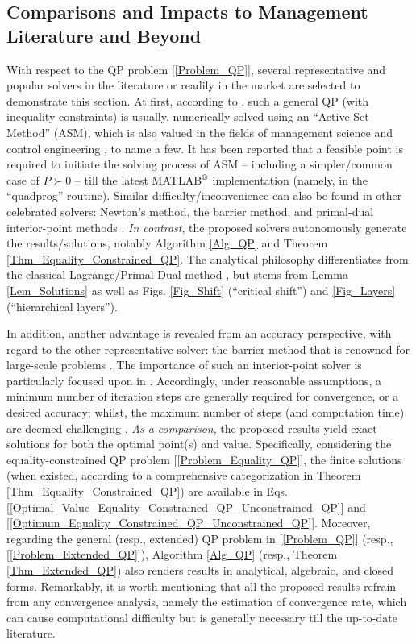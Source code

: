 \documentclass[9pt,twocolumn,twoside,lineno]{pnas-new-1}
\theoremstyle{remark}
\begin{document}
\subsection{Comparisons and Impacts to Management Literature and Beyond}
\label{Subsec_Literature_Comparison}
With respect to the QP problem [\ref{Problem_QP}], several representative and popular solvers in the literature or readily in the market \citep{NoWr:06} are selected to demonstrate this section. At first, according to \cite{Lu(Ye):03(16)}, such a general QP (with inequality constraints) is usually, numerically solved using an ``Active Set Method'' (ASM), which is also valued in the fields of management science \citep{Hey:acc,KoYa:91} and control engineering \citep{JoFo:13}, to name a few. It has been reported that a feasible point is required to initiate the solving process of ASM -- including a simpler/common case of $P\succ 0$ \citep{Lu(Ye):03(16)} -- till the latest MATLAB$\textsuperscript{\textregistered}$ implementation (namely, in the ``quadprog'' routine). Similar difficulty/inconvenience can also be found in other celebrated solvers: Newton's method, the barrier method, and primal-dual interior-point methods \citep{BoVa:04,Hey:acc,JoFo:13}. \textit{In contrast}, the proposed solvers autonomously generate the results/solutions, notably Algorithm \ref{Alg_QP} and Theorem \ref{Thm_Equality_Constrained_QP}. The analytical philosophy differentiates from the classical Lagrange/Primal-Dual method \citep{BoVa:04,Lu(Ye):03(16),NoWr:06}, but stems from Lemma \ref{Lem_Solutions} as well as Figs. \ref{Fig_Shift} (``critical shift'') and \ref{Fig_Layers} (``hierarchical layers'').

In addition, another advantage is revealed from an accuracy perspective, with regard to the other representative solver: the barrier method that is renowned for large-scale problems \citep{JoFo:13}. The importance of such an interior-point solver is particularly focused upon in \cite[Chapter 11]{BoVa:04}. Accordingly, under reasonable assumptions, a minimum number of iteration steps are generally required for convergence, or a desired accuracy; whilst, the maximum number of steps (and computation time) are deemed challenging \citep{JoFo:13}. \textit{As a comparison}, the proposed results yield exact solutions for both the optimal point(s) and value. Specifically, considering the equality-constrained QP problem [\ref{Problem_Equality_QP}], the finite solutions (when existed, according to a comprehensive categorization in Theorem \ref{Thm_Equality_Constrained_QP}) are available in Eqs. [\ref{Optimal_Value_Equality_Constrained_QP_Unconstrained_QP}] and [\ref{Optimum_Equality_Constrained_QP_Unconstrained_QP}]. Moreover, regarding the general (resp., extended) QP problem in [\ref{Problem_QP}] (resp., [\ref{Problem_Extended_QP}]), Algorithm \ref{Alg_QP} (resp., Theorem \ref{Thm_Extended_QP}) also renders results in analytical, algebraic, and closed forms. Remarkably, it is worth mentioning that all the proposed results refrain from any convergence analysis, namely the estimation of convergence rate, which can cause computational difficulty \citep{DuJoWaWi:15} but is generally necessary till the up-to-date literature.
\end{document}
